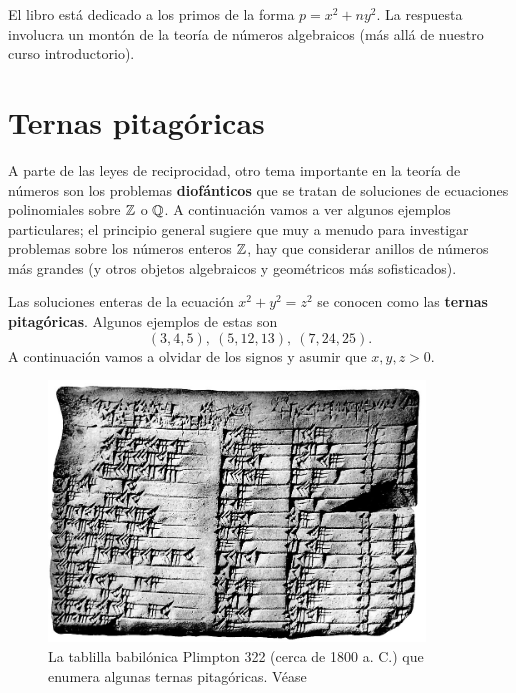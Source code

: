 \begin{comentario}
  El libro \cite{Cox-2013} está dedicado a los primos de la forma
  $p = x^2 + ny^2$. La respuesta involucra un montón de la teoría de números
  algebraicos (más allá de nuestro curso introductorio).
\end{comentario}



\section{Ternas pitagóricas}

A parte de las leyes de reciprocidad, otro tema importante en la teoría de
números son los problemas \textbf{diofánticos} que se tratan de soluciones de
ecuaciones polinomiales sobre $\mathbb{Z}$ o $\mathbb{Q}$. A continuación vamos a ver algunos
ejemplos particulares; el principio general sugiere que muy a menudo para
investigar problemas sobre los números enteros $\mathbb{Z}$, hay que considerar anillos
de números más grandes (y otros objetos algebraicos y geométricos más
sofisticados).

\vspace{1em}

Las soluciones enteras de la ecuación $x^2 + y^2 = z^2$ se conocen como las
\textbf{ternas pitagóricas}. Algunos ejemplos de estas son
$$(3, 4, 5), ~ (5, 12, 13), ~ (7, 24, 25).$$
A continuación vamos a olvidar de los signos y asumir que $x,y,z > 0$.

\begin{figure}
  \begin{center}
    \includegraphics[width=10cm]{pic/Plimpton_322.jpg}
  \end{center}

  \caption{La tablilla babilónica Plimpton 322 (cerca de 1800 a. C.) que enumera
    algunas ternas pitagóricas. Véase \cite[\S I.V]{Weil-history}}
\end{figure}

